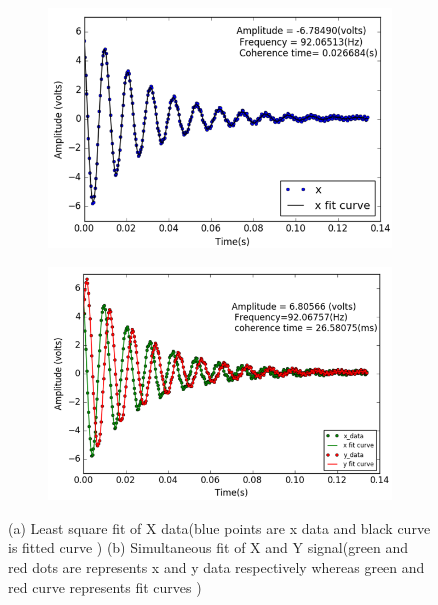 \documentclass[12pt]{report}
\begin{document}
\begin{itemize}
\begin{figure}
    \begin{subfigure}[b]{0.45\textwidth}
        \centering
        \includegraphics[width=\textwidth]{figures/fid_x_fit}
        \caption{}
        \label{fig:three sin x}
    \end{subfigure}
    \hfill
    \begin{subfigure}[b]{0.45\textwidth}
        \centering
        \includegraphics[width=\textwidth]{figures/fid_simultaneous}
        \caption{}
        \label{fig:five over x}
    \end{subfigure}
    \caption{(a) Least square fit of X data(blue points are x data and black curve is fitted curve ) (b) Simultaneous fit of X and Y signal(green and red dots are represents x and y data respectively whereas green and red curve represents fit curves ) }
    \label{fig:three graphs}
\end{figure}


\end{itemize}
\end{document}
